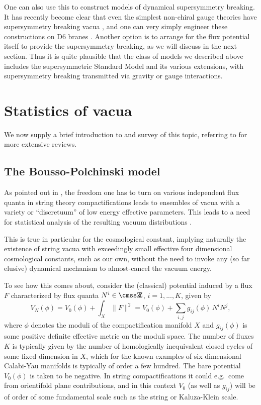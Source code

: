 \documentclass[aps,amsfonts]{ar2e}
\begin{document}
One can also use this to construct models of dynamical supersymmetry
breaking.  It has recently become clear that even the simplest
non-chiral gauge theories have supersymmetry breaking vacua
\cite{Intriligator:2006dd}, and one can very simply engineer these
constructions on D6 branes \cite{Ooguri:2006bg}.  Another option is to
arrange for the flux potential itself to provide the supersymmetry
breaking, as we will discuss in the next section.  Thus it is quite
plausible that the class of models we described above includes the
supersymmetric Standard Model and its various extensions, with
supersymmetry breaking transmitted via gravity or gauge
interactions.

\section{Statistics of vacua}
\label{sec:stat}

We now supply a brief introduction to and survey
of this topic, referring to
\cite{Douglas:2006es,Kumar:2006tn}
for more extensive reviews.

\subsection{The Bousso-Polchinski model}

As pointed out in \cite{Bousso:2000xa}, the freedom one has to turn on
various independent flux quanta in string theory compactifications
leads to ensembles of vacua with a variety or ``discretuum'' of low
energy effective parameters.  This leads to a need for statistical
analysis of the resulting vacuum distributions \cite{Douglas:2003um}.

This is true in particular for the cosmological constant, implying
naturally the existence of string vacua with exceedingly small
effective four dimensional cosmological constants, such as our own,
without the need to invoke any (so far elusive) dynamical mechanism
to almost-cancel the vacuum energy.

To see how this comes about, consider
the (classical) potential induced by a flux $F$ characterized by
flux quanta $N^i \in \IZ$, $i=1,...,K$, given by
\begin{equation}
 V_N(\phi) =
 V_0(\phi) + \int_X \| F \|^2 = V_0(\phi) + \sum_{i,j} g_{ij}(\phi) \, N^i
 N^j,
\end{equation}
where $\phi$ denotes the moduli of the compactification manifold $X$
and $g_{ij}(\phi)$ is some positive definite effective metric on the
moduli space. The number of fluxes $K$ is typically given by the
number of homologically inequivalent closed cycles of some fixed
dimension in $X$, which for the known examples of six dimensional
Calabi-Yau manifolds is typically of order a few hundred. The bare
potential $V_0(\phi)$ is taken to be negative. In string
compactifications it could e.g.\ come from orientifold plane
contributions, and in this context $V_0$ (as well as $g_{ij}$) will
be of order of some fundamental scale such as the string or
Kaluza-Klein scale.
\end{document}
